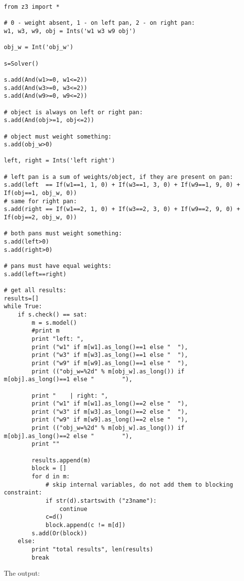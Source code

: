 \begin{lstlisting}[style=custompy]
from z3 import *

# 0 - weight absent, 1 - on left pan, 2 - on right pan:
w1, w3, w9, obj = Ints('w1 w3 w9 obj')

obj_w = Int('obj_w')

s=Solver()

s.add(And(w1>=0, w1<=2))
s.add(And(w3>=0, w3<=2))
s.add(And(w9>=0, w9<=2))

# object is always on left or right pan:
s.add(And(obj>=1, obj<=2))

# object must weight something:
s.add(obj_w>0)

left, right = Ints('left right')

# left pan is a sum of weights/object, if they are present on pan:
s.add(left  == If(w1==1, 1, 0) + If(w3==1, 3, 0) + If(w9==1, 9, 0) + If(obj==1, obj_w, 0))
# same for right pan:
s.add(right == If(w1==2, 1, 0) + If(w3==2, 3, 0) + If(w9==2, 9, 0) + If(obj==2, obj_w, 0))

# both pans must weight something:
s.add(left>0)
s.add(right>0)

# pans must have equal weights:
s.add(left==right)

# get all results:
results=[]
while True:
    if s.check() == sat:
        m = s.model()
        #print m
        print "left: ",
        print ("w1" if m[w1].as_long()==1 else "  "),
        print ("w3" if m[w3].as_long()==1 else "  "),
        print ("w9" if m[w9].as_long()==1 else "  "),
        print (("obj_w=%2d" % m[obj_w].as_long()) if m[obj].as_long()==1 else "        "),

        print "    | right: ",
        print ("w1" if m[w1].as_long()==2 else "  "),
        print ("w3" if m[w3].as_long()==2 else "  "),
        print ("w9" if m[w9].as_long()==2 else "  "),
        print (("obj_w=%2d" % m[obj_w].as_long()) if m[obj].as_long()==2 else "        "),
        print ""

        results.append(m)
        block = []
        for d in m:
            # skip internal variables, do not add them to blocking constraint:
            if str(d).startswith ("z3name"):
                continue
            c=d()
            block.append(c != m[d])
        s.add(Or(block))
    else:
        print "total results", len(results)
        break
\end{lstlisting}

The output:

